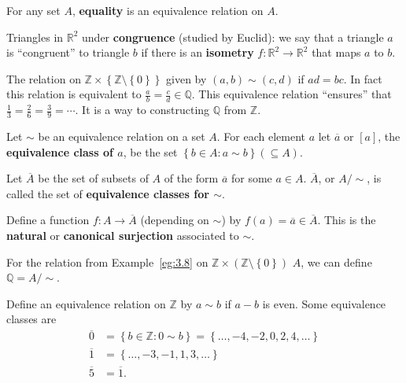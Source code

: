 \documentclass{notes}
\begin{document}
\begin{eg}
  For any set $A$, {\boldmath \bfseries equality} is an equivalence relation on $A$.
\end{eg}

\begin{eg}
  Triangles in $\mathbb R^2$ under {\boldmath \bfseries congruence} (studied by Euclid): we say that a triangle $a$ is ``congruent'' to triangle $b$ if there is an {\boldmath \bfseries isometry} $f \colon \mathbb R^2 \to \mathbb R^2$ that maps $a$ to $b$.
\end{eg}

\begin{eg}
  The relation on $\mathbb Z \times \left \{ \mathbb Z \setminus \left \{ 0 \right \} \right \}$ given by $(a, b) \sim (c, d)$ if $a d = b c$.
  In fact this relation is equivalent to $\frac{a}{b} = \frac{c}{d} \in \mathbb Q$.
  This equivalence relation ``ensures'' that $\frac{1}{3} = \frac{2}{6} = \frac{3}{9} = \cdots$.
  It is a way to constructing $\mathbb Q$ from $\mathbb Z$.
\end{eg}

\begin{defn}
  Let $\sim$ be an equivalence relation on a set $A$.
  For each element $a$ let {\boldmath \bfseries $\overline a$} or {\boldmath \bfseries $[a]$}, the {\boldmath \bfseries equivalence class of $a$}, be the set $\left \{ b \in A : a \sim b \right \} (\subseteq A)$.

  Let $\overline A$ be the set of subsets of $A$ of the form $\overline a$ for some $a \in A$.
  $\overline A$, or $A/\sim$, is called the set of {\boldmath \bfseries equivalence classes for $\sim$}.

  Define a function $f \colon A \to \overline A$ (depending on $\sim$) by $f(a) = \overline a \in \overline A$.
  This is the {\boldmath \bfseries natural} or {\boldmath \bfseries canonical surjection} associated to $\sim$.
\end{defn}

\begin{eg}
  For the relation from Example~\ref{eg:3.8} on $\mathbb Z \times (\mathbb Z \setminus \left \{ 0 \right \})$ $A$, we can define $\mathbb Q = A/\sim$.
\end{eg}

\begin{eg}
  Define an equivalence relation on $\mathbb Z$ by $a \sim b$ if $a - b$ is even.
  Some equivalence classes are 
  \begin{align*}
    \overline 0 &= \left \{ b \in \mathbb Z : 0 \sim b \right \} = \left \{ \dots, -4, -2, 0, 2, 4, \dots \right \} \\ 
    \overline 1 &= \left \{ \dots, -3, -1, 1, 3, \dots \right \} \\ 
    \overline 5 &= \overline 1.
  \end{align*}
\end{eg}
\end{document}
